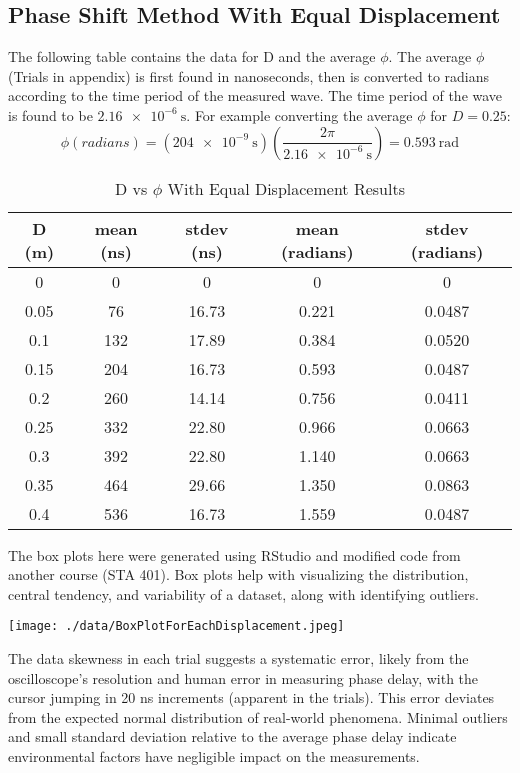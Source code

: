\documentclass[12pt]{article}
\begin{document}
	
	\subsection{Phase Shift Method With Equal Displacement}
	
	The following table contains the data for D and the average $\phi$. The average $\phi$ (Trials in appendix) is first found in nanoseconds, then is converted to radians according to the time period of the measured wave. The time period of the wave is found to be $\qty{2.16e-6}{\second}$. For example converting the average $\phi$ for $D=0.25$:
	\[
		\phi(radians) = \left( \qty{204e-9}{\second} \right) \left( \frac{2\pi}{\qty{2.16e-6}{\second}} \right) = \qty{0.593}{\radian}
	\]

	\begin{table}[!h]
		\centering
		\caption{D vs $\phi$ With Equal Displacement Results}
		\label{DvsPhi_EqualDisplacementResults}
		\begin{tabular}{|c|c|c|c|c|}
			\hline
			\textbf{D (m)} & \textbf{mean (ns)} & \textbf{stdev (ns)} & \textbf{mean (radians)} & \textbf{stdev (radians)} \\
			\hline
			0 & 0 & 0 & 0 & 0 \\
			\hline
			0.05 & 76 & 16.73 & 0.221 & 0.0487 \\
			\hline
			0.1 & 132 & 17.89 & 0.384 & 0.0520 \\
			\hline
			0.15 & 204  & 16.73 & 0.593 & 0.0487 \\
			\hline
			0.2 & 260 & 14.14 & 0.756 & 0.0411 \\
			\hline
			0.25 & 332 & 22.80 & 0.966 & 0.0663 \\
			\hline
			0.3 & 392 & 22.80 & 1.140 & 0.0663 \\
			\hline
			0.35 & 464 & 29.66 & 1.350 & 0.0863 \\
			\hline
			0.4 & 536 & 16.73 & 1.559 & 0.0487 \\
			\hline
		\end{tabular}
	\end{table}
	
	\begin{minipage}{.5\textwidth}
		The box plots here were generated using RStudio and modified code from another course (STA 401). Box plots help with visualizing the distribution, central tendency, and variability of a dataset, along with identifying outliers.
	\end{minipage}
	\hspace{.5cm}
	\begin{minipage}{.5\textwidth}
		\texttt{[image: ./data/BoxPlotForEachDisplacement.jpeg]}
	\end{minipage}
	The data skewness in each trial suggests a systematic error, likely from the oscilloscope's resolution and human error in measuring phase delay, with the cursor jumping in 20 ns increments (apparent in the trials). This error deviates from the expected normal distribution of real-world phenomena. Minimal outliers and small standard deviation relative to the average phase delay indicate environmental factors have negligible impact on the measurements.
	
\end{document}
